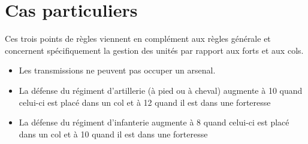     
  \section{Cas particuliers}
  
Ces trois points de règles viennent en complément aux règles générale et concernent spécifiquement la gestion des unités par rapport aux forts et aux cols.  
  
    \begin{itemize}
      \renewcommand{\labelitemi}{$\bullet$}
        \item Les transmissions ne peuvent pas occuper un arsenal.
        \item La défense du régiment d'artillerie (à pied ou à cheval) augmente à 10 quand celui-ci est placé dans un col et à 12 quand il est dans une forteresse 
        \item La défense du régiment d'infanterie augmente à 8 quand celui-ci est placé dans un col et à 10 quand il est dans une forteresse 

    \end{itemize}
   
  
	\clearpage
